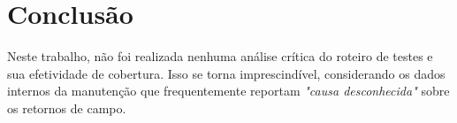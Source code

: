    \section{Conclusão}
       
        
        Neste trabalho, não foi realizada nenhuma análise crítica do roteiro de testes e sua efetividade de cobertura. Isso se torna imprescindível, considerando os dados internos da manutenção que frequentemente reportam \textit{"causa desconhecida"} sobre os retornos de campo.
        

